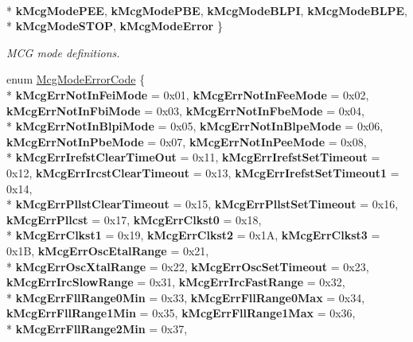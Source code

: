 \begin{DoxyCompactItemize}
\\*
{\bfseries k\+Mcg\+Mode\+P\+EE}, 
{\bfseries k\+Mcg\+Mode\+P\+BE}, 
{\bfseries k\+Mcg\+Mode\+B\+L\+PI}, 
{\bfseries k\+Mcg\+Mode\+B\+L\+PE}, 
\\*
{\bfseries k\+Mcg\+Mode\+S\+T\+OP}, 
{\bfseries k\+Mcg\+Mode\+Error}
 \}\hypertarget{group__mcg__hal_gacbfe9563601260b279eeb6d4a8c701e0}{}\label{group__mcg__hal_gacbfe9563601260b279eeb6d4a8c701e0}
\begin{DoxyCompactList}\small\item\em M\+CG mode definitions. \end{DoxyCompactList}
\item 
enum \hyperlink{group__mcg__hal_ga2ab548eca13afeee8091a03bee7a68d0}{Mcg\+Mode\+Error\+Code} \{ \\*
{\bfseries k\+Mcg\+Err\+Not\+In\+Fei\+Mode} = 0x01, 
{\bfseries k\+Mcg\+Err\+Not\+In\+Fee\+Mode} = 0x02, 
{\bfseries k\+Mcg\+Err\+Not\+In\+Fbi\+Mode} = 0x03, 
{\bfseries k\+Mcg\+Err\+Not\+In\+Fbe\+Mode} = 0x04, 
\\*
{\bfseries k\+Mcg\+Err\+Not\+In\+Blpi\+Mode} = 0x05, 
{\bfseries k\+Mcg\+Err\+Not\+In\+Blpe\+Mode} = 0x06, 
{\bfseries k\+Mcg\+Err\+Not\+In\+Pbe\+Mode} = 0x07, 
{\bfseries k\+Mcg\+Err\+Not\+In\+Pee\+Mode} = 0x08, 
\\*
{\bfseries k\+Mcg\+Err\+Irefst\+Clear\+Time\+Out} = 0x11, 
{\bfseries k\+Mcg\+Err\+Irefst\+Set\+Timeout} = 0x12, 
{\bfseries k\+Mcg\+Err\+Ircst\+Clear\+Timeout} = 0x13, 
{\bfseries k\+Mcg\+Err\+Irefst\+Set\+Timeout1} = 0x14, 
\\*
{\bfseries k\+Mcg\+Err\+Pllst\+Clear\+Timeout} = 0x15, 
{\bfseries k\+Mcg\+Err\+Pllst\+Set\+Timeout} = 0x16, 
{\bfseries k\+Mcg\+Err\+Pllcst} = 0x17, 
{\bfseries k\+Mcg\+Err\+Clkst0} = 0x18, 
\\*
{\bfseries k\+Mcg\+Err\+Clkst1} = 0x19, 
{\bfseries k\+Mcg\+Err\+Clkst2} = 0x1A, 
{\bfseries k\+Mcg\+Err\+Clkst3} = 0x1B, 
{\bfseries k\+Mcg\+Err\+Osc\+Etal\+Range} = 0x21, 
\\*
{\bfseries k\+Mcg\+Err\+Osc\+Xtal\+Range} = 0x22, 
{\bfseries k\+Mcg\+Err\+Osc\+Set\+Timeout} = 0x23, 
{\bfseries k\+Mcg\+Err\+Irc\+Slow\+Range} = 0x31, 
{\bfseries k\+Mcg\+Err\+Irc\+Fast\+Range} = 0x32, 
\\*
{\bfseries k\+Mcg\+Err\+Fll\+Range0\+Min} = 0x33, 
{\bfseries k\+Mcg\+Err\+Fll\+Range0\+Max} = 0x34, 
{\bfseries k\+Mcg\+Err\+Fll\+Range1\+Min} = 0x35, 
{\bfseries k\+Mcg\+Err\+Fll\+Range1\+Max} = 0x36, 
\\*
{\bfseries k\+Mcg\+Err\+Fll\+Range2\+Min} = 0x37, 

\end{DoxyCompactItemize}
